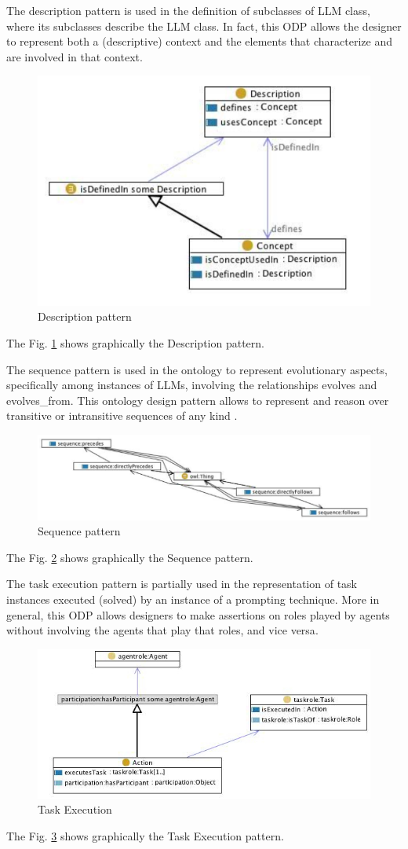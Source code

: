 The description pattern is used in the definition of subclasses of LLM class, where its subclasses describe the LLM class.\cite{description_pattern}
In fact, this ODP allows the designer to represent both a (descriptive) context and the elements that characterize and are involved in that context.

\begin{figure}[H]
    \centering
    \includegraphics[width=0.6\linewidth]{Figures/fig_73.png}
    \caption{Description pattern}
    \label{fig:73}
\end{figure}
The Fig. \ref{fig:73} shows graphically the Description pattern.

The sequence pattern is used in the ontology to represent evolutionary aspects, specifically among instances of LLMs, involving the relationships evolves and evolves\_from.
This ontology design pattern allows to represent and reason over transitive or intransitive sequences of any kind \cite{sequence_pattern}.
\begin{figure}[H]
    \centering
    \includegraphics[width=0.8\linewidth]{Figures/fig_74.png}
    \caption{Sequence pattern}
    \label{fig:74}
\end{figure}
The Fig. \ref{fig:74} shows graphically the Sequence pattern.

The task execution pattern is partially used in the representation of task instances executed (solved) by an instance of a prompting technique. More in general, this ODP allows designers to make assertions on roles played by agents without involving the agents that play that roles, and vice versa\cite{task_execution}.

\begin{figure}[H]
    \centering
    \includegraphics[width=0.8\linewidth]{Figures/fig_75.png}
    \caption{Task Execution}
    \label{fig:75}
\end{figure}
The Fig. \ref{fig:75} shows graphically the Task Execution pattern.

